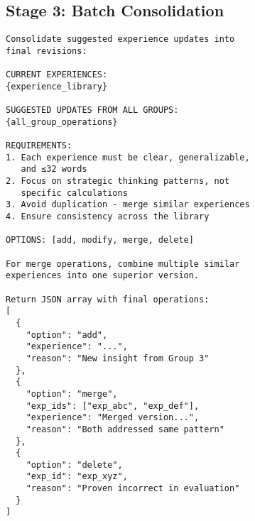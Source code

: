 \documentclass[11pt,letterpaper]{article}
\begin{document}
\subsection{Stage 3: Batch Consolidation}

\begin{lstlisting}[caption=Full Consolidation Prompt]
Consolidate suggested experience updates into 
final revisions:

CURRENT EXPERIENCES:
{experience_library}

SUGGESTED UPDATES FROM ALL GROUPS:
{all_group_operations}

REQUIREMENTS:
1. Each experience must be clear, generalizable, 
   and ≤32 words
2. Focus on strategic thinking patterns, not 
   specific calculations
3. Avoid duplication - merge similar experiences
4. Ensure consistency across the library

OPTIONS: [add, modify, merge, delete]

For merge operations, combine multiple similar 
experiences into one superior version.

Return JSON array with final operations:
[
  {
    "option": "add",
    "experience": "...",
    "reason": "New insight from Group 3"
  },
  {
    "option": "merge",
    "exp_ids": ["exp_abc", "exp_def"],
    "experience": "Merged version...",
    "reason": "Both addressed same pattern"
  },
  {
    "option": "delete",
    "exp_id": "exp_xyz",
    "reason": "Proven incorrect in evaluation"
  }
]
\end{lstlisting}
\end{document}
